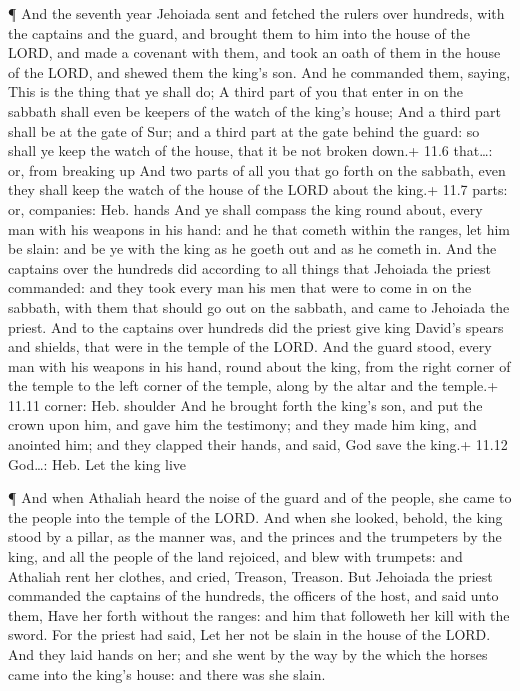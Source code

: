  ¶ And the seventh year Jehoiada sent and fetched the rulers
over hundreds, with the captains and the guard, and brought them to him
into the house of the LORD, and made a covenant with them, and took an
oath of them in the house of the LORD, and shewed them the king's son.
 And he commanded them, saying, This is the thing that ye
shall do; A third part of you that enter in on the sabbath shall even be
keepers of the watch of the king's house;  And a third part
shall be at the gate of Sur; and a third part at the gate behind the
guard: so shall ye keep the watch of the house, that it be not broken
down.+ 11.6 that\ldots: or, from breaking up  And two parts
of all you that go forth on the sabbath, even they shall keep the watch
of the house of the LORD about the king.+ 11.7 parts: or, companies:
Heb. hands  And ye shall compass the king round about, every
man with his weapons in his hand: and he that cometh within the ranges,
let him be slain: and be ye with the king as he goeth out and as he
cometh in.  And the captains over the hundreds did according
to all things that Jehoiada the priest commanded: and they took every
man his men that were to come in on the sabbath, with them that should
go out on the sabbath, and came to Jehoiada the priest. 
And to the captains over hundreds did the priest give king David's
spears and shields, that were in the temple of the LORD. 
And the guard stood, every man with his weapons in his hand, round about
the king, from the right corner of the temple to the left corner of the
temple, along by the altar and the temple.+ 11.11 corner: Heb. shoulder
 And he brought forth the king's son, and put the crown
upon him, and gave him the testimony; and they made him king, and
anointed him; and they clapped their hands, and said, God save the
king.+ 11.12 God\ldots: Heb. Let the king live

 ¶ And when Athaliah heard the noise of the guard and of
the people, she came to the people into the temple of the LORD.
 And when she looked, behold, the king stood by a pillar,
as the manner was, and the princes and the trumpeters by the king, and
all the people of the land rejoiced, and blew with trumpets: and
Athaliah rent her clothes, and cried, Treason, Treason. 
But Jehoiada the priest commanded the captains of the hundreds, the
officers of the host, and said unto them, Have her forth without the
ranges: and him that followeth her kill with the sword. For the priest
had said, Let her not be slain in the house of the LORD. 
And they laid hands on her; and she went by the way by the which the
horses came into the king's house: and there was she slain.

